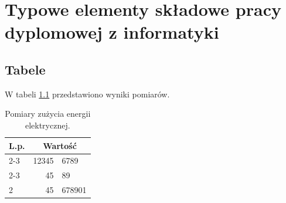 \chapter{Typowe elementy składowe pracy dyplomowej z informatyki}
\section{Tabele}

W tabeli \ref{tab:result} przedstawiono wyniki pomiarów.
\begin{table}[!h]
    \caption{Pomiary zużycia energii elektrycznej\label{tab:result}.}
    \centering
    \begin{tabular}{|l||r@{,}l|}
        \hline
        \textbf{L.p.} & \multicolumn{2}{|c|}{\textbf{Wartość}}          \\
        \hline
        \hline
        \cline{2-3}
        \hline
        1             & 12345                                  & 6789   \\
        \cline{2-3}
                      & 45                                     & 89     \\
        \hline
        2             & 45                                     & 678901 \\
        \hline
    \end{tabular}
\end{table}

